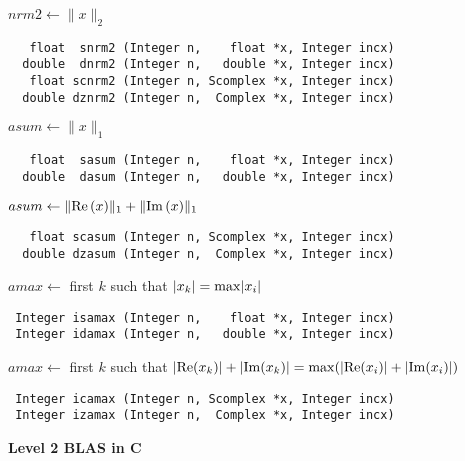 \newpage
\normalsize
\noindent
$nrm2 \leftarrow \|x\|_2$
\footnotesize
\begin{verbatim}
   float  snrm2 (Integer n,    float *x, Integer incx)
  double  dnrm2 (Integer n,   double *x, Integer incx)
   float scnrm2 (Integer n, Scomplex *x, Integer incx)
  double dznrm2 (Integer n,  Complex *x, Integer incx)
\end{verbatim}
\normalsize
$asum \leftarrow \|x\|_1$
\footnotesize
\begin{verbatim}
   float  sasum (Integer n,    float *x, Integer incx)
  double  dasum (Integer n,   double *x, Integer incx)
\end{verbatim}
\normalsize
$asum \leftarrow \|{\rm Re} \, (x)\|_1 + \|{\rm Im} \, (x)\|_1$
\footnotesize
\begin{verbatim}
   float scasum (Integer n, Scomplex *x, Integer incx)
  double dzasum (Integer n,  Complex *x, Integer incx)
\end{verbatim}
\normalsize
$amax \leftarrow$ first $k$ such that $|x_k| = {\rm max} |x_i|$
\footnotesize
\begin{verbatim}
 Integer isamax (Integer n,    float *x, Integer incx)
 Integer idamax (Integer n,   double *x, Integer incx)
\end{verbatim}
\normalsize
$amax \leftarrow$ first $k$ such that 
 $|{\rm Re} (x_k)| + |{\rm Im} (x_k)| = {\rm max}(|{\rm Re} (x_i)| +
 |{\rm Im} (x_i)| )$
\footnotesize
\begin{verbatim}
 Integer icamax (Integer n, Scomplex *x, Integer incx)
 Integer izamax (Integer n,  Complex *x, Integer incx)
\end{verbatim}
\normalsize

\newpage
\noindent
{\large {\bf Level 2 BLAS in C}}

